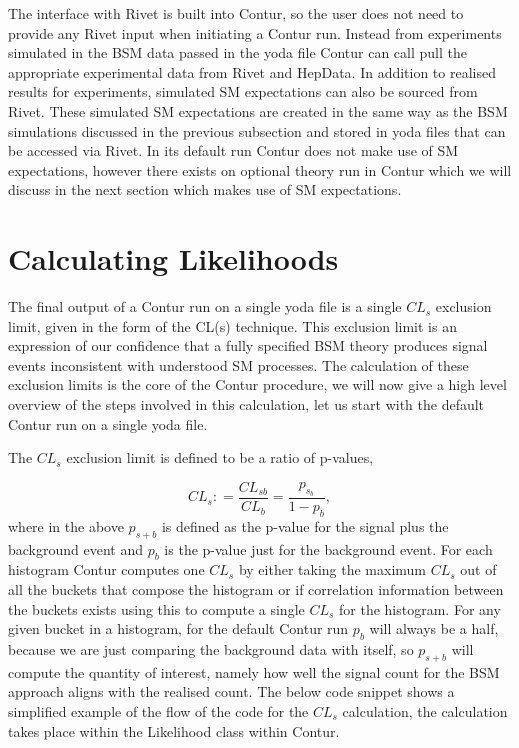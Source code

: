 The interface with Rivet is built into Contur, so the user does not need to provide any Rivet input when initiating a Contur run. Instead from experiments simulated in the BSM data passed in the yoda file Contur can call pull the appropriate experimental data from Rivet and HepData. In addition to realised results for experiments, simulated SM expectations can also be sourced from Rivet. These simulated SM expectations are created in the same way as the BSM simulations discussed in the previous subsection and stored in yoda files that can be accessed via Rivet. In its default run Contur does not make use of SM expectations, however there exists on optional theory run in Contur which we will discuss in the next section which makes use of SM expectations.


\section{Calculating Likelihoods}

The final output of a Contur run on a single yoda file is a single $CL_s$ exclusion limit, given in the form of the CL(s) technique\cite{cls}. This exclusion limit is an expression of our confidence that a fully specified BSM theory produces signal events inconsistent with understood SM processes.  The calculation of these exclusion limits is the core of the Contur procedure, we will now give a high level overview of the steps involved in this calculation, let us start with the default Contur run on a single yoda file.

The $CL_s$ exclusion limit is defined to be a ratio of p-values,

$$ CL_s: = \frac{CL_{sb}}{CL_{b}} = \frac{p_{s_b}}{1- p_{b}}, $$
where in the above $p_{s+b}$ is defined as the p-value for the signal plus the background event and $p_{b}$ is the p-value just for the background event. For each histogram Contur computes one $CL_{s}$ by either taking the maximum $CL_{s}$ out of all the buckets that compose the histogram or if correlation information between the buckets exists using this to compute a single $CL_s$ for the histogram. For any given bucket in a histogram, for the default Contur run $p_b$ will always be a half, because we are just comparing the background data with itself, so $p_{s+b}$ will compute the quantity of interest, namely how well the signal count for the BSM approach aligns with the realised count. The below code snippet shows a simplified example of the  flow of the code for the $CL_s$ calculation, the calculation takes place within the Likelihood class within Contur.

